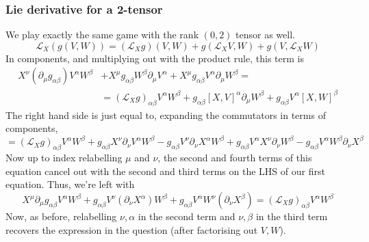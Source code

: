 \subsubsection*{Lie derivative for a 2-tensor} 
We play exactly the same game with 
the rank $ ( 0 , 2) $ tensor as well. 
 \[
	 \mathcal{L }_ X  ( g ( V , W) ) = (\mathcal{L }_{X } g ) ( V, W) + g ( \mathcal{L }_X V, W ) + g ( V, \mathcal{L }_X W )  
\] In components, and multiplying out with the product rule, 
this term is 
\begin{align*}
	X^\nu (\partial  _\mu g_{ \alpha \beta }) V^\alpha W^\beta & + X^\mu g_{ \alpha \beta } W ^ \beta \partial _\mu V ^\alpha + X^\mu g _{ \alpha \beta } V^\alpha \partial _\mu W^ \beta  = \\ 																	    & = ( \mathcal{ L }_X g ) _{ \alpha \beta } V^ \alpha W ^ \beta + g_{ \alpha \beta } [ X , V]^ \alpha \partial _\mu W^ \beta + g_{ \alpha \beta } V ^ \alpha [ X, W ] ^ \beta 	    
\end{align*} The right hand side 
is just equal to, expanding the commutators in terms of components, 
\[
	= ( \mathcal{ L }_X g ) _{ \alpha \beta } V ^ \alpha W ^ \beta + g_{ \alpha \beta } X^\nu \partial  _\nu V ^ \alpha W ^ \beta  -g _{ \alpha \beta } V ^\nu \partial _\nu X ^ \alpha W ^ \beta + g_{ \alpha \beta } V ^ \alpha X ^ \nu \partial  _\nu W ^ \beta - g_{ \alpha \beta } V ^ \alpha W ^ \beta \partial  _\nu X  ^ \beta 
\] Now up to index relabelling $ \mu $ and $ \nu $, the second and fourth 
terms of this equation cancel out with the second and third terms on the LHS of our first equation. 
Thus, we're left with 
\[
X^\mu \partial _\mu g_{ \alpha \beta } V ^ \alpha W ^ \beta + g_{ \alpha \beta } V ^ \nu ( \partial  _\nu X ^ \alpha ) W ^ \beta + g _{ \alpha \beta } V ^ \alpha W^\nu ( \partial  _\nu X ^ \beta ) = ( \mathcal{ L }_ X g )_{ \alpha \beta } V ^ \alpha W ^ \beta 
\] Now, as before, relabelling $ \nu , \alpha$ in the second term and $ \nu , \beta $ in the third term 
recovers the expression in the question (after factorising out  $ V , W $).

